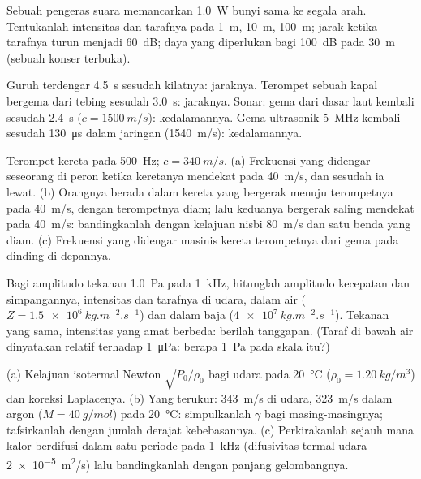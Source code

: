 \begin{exercise}[$\star$]\label{exo:b2:sound-waves:3}
Sebuah pengeras suara memancarkan \qty{1.0}{W} bunyi sama ke segala arah.
Tentukanlah intensitas dan tarafnya pada \qty{1}{m}, \qty{10}{m}, \qty{100}{m}; jarak ketika
tarafnya turun menjadi \qty{60}{dB}; daya yang diperlukan bagi \qty{100}{dB} pada \qty{30}{m}
(sebuah konser terbuka).
\end{exercise}

\begin{exercise}[$\star$]\label{exo:b2:sound-waves:4}
Guruh terdengar \qty{4.5}{s} sesudah kilatnya: jaraknya. Terompet sebuah kapal
bergema dari tebing sesudah \qty{3.0}{s}: jaraknya. Sonar: gema dari
dasar laut kembali sesudah \qty{2.4}{s} ($c = \qty{1500}{m/s}$): kedalamannya. Gema
ultrasonik \qty{5}{MHz} kembali sesudah \qty{130}{\micro s} dalam jaringan
(\qty{1540}{m/s}): kedalamannya.
\end{exercise}

\begin{exercise}[$\star\star$]\label{exo:b2:sound-waves:5}
Terompet kereta pada \qty{500}{Hz}; $c = \qty{340}{m/s}$. (a) Frekuensi yang didengar
seseorang di peron ketika keretanya mendekat pada \qty{40}{m/s}, dan
sesudah ia lewat. (b) Orangnya berada dalam kereta yang bergerak menuju
terompetnya pada \qty{40}{m/s}, dengan terompetnya diam; lalu keduanya bergerak saling
mendekat pada \qty{40}{m/s}: bandingkanlah dengan kelajuan nisbi \qty{80}{m/s} dan
satu benda yang diam. (c) Frekuensi yang didengar masinis kereta terompetnya
dari gema pada dinding di depannya.
\end{exercise}

\begin{exercise}[$\star\star$]\label{exo:b2:sound-waves:6}
Bagi amplitudo tekanan \qty{1.0}{Pa} pada \qty{1}{kHz}, hitunglah
amplitudo kecepatan dan simpangannya, intensitas dan tarafnya di
udara, dalam air ($Z = \qty{1.5e6}{kg.m^{-2}.s^{-1}}$) dan dalam baja
($\qty{4e7}{kg.m^{-2}.s^{-1}}$). Tekanan yang sama, intensitas yang amat berbeda:
berilah tanggapan. (Taraf di bawah air dinyatakan relatif terhadap \qty{1}{\micro Pa}: berapa
\qty{1}{Pa} pada skala itu?)
\end{exercise}

\begin{exercise}[$\star\star$]\label{exo:b2:sound-waves:7}
(a) Kelajuan isotermal Newton $\sqrt{P_0/\rho_0}$ bagi udara pada
\qty{20}{\degreeCelsius} ($\rho_0 = \qty{1.20}{kg/m^3}$) dan koreksi Laplacenya.
(b) Yang terukur: \qty{343}{m/s} di udara, \qty{323}{m/s} dalam argon ($M = \qty{40}{g/mol}$)
pada \qty{20}{\degreeCelsius}: simpulkanlah $\gamma$ bagi masing-masingnya; tafsirkanlah dengan
jumlah derajat kebebasannya. (c) Perkirakanlah sejauh mana kalor berdifusi dalam
satu periode pada \qty{1}{kHz} (difusivitas termal udara
\qty{2e-5}{m^2/s}) lalu bandingkanlah dengan panjang gelombangnya.
\end{exercise}

